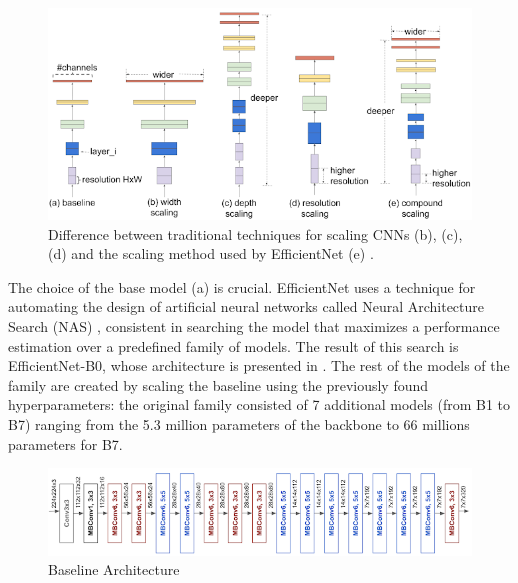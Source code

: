  \begin{figure}[tb]
    \centering
    \includegraphics[width=\textwidth]{figures/chapter5/efficient/compoundScaling.png}
    \caption{Difference between traditional techniques for scaling CNNs (b), (c), (d) and the scaling method used by EfficientNet (e) \cite{efficientNet}.}
    \label{fig:scaling}
\end{figure}
The choice of the base model (a) is crucial. EfficientNet uses a technique for automating the design of artificial neural networks called Neural Architecture Search (NAS) \cite{white2023neural}, consistent in searching the model that maximizes a performance estimation over a predefined family of models. The result of this search is EfficientNet-B0, whose architecture is presented in . The rest of the models of the family are created by scaling the baseline using the previously found hyperparameters: the original family consisted of 7 additional models (from B1 to B7) ranging from the 5.3 million parameters of the backbone to 66 millions parameters for B7.

\begin{figure}[tb]
    \centering
    \includegraphics[width=\textwidth]{figures/chapter5/efficient/EfficientNetv0.png}
    \caption{Baseline Architecture}
    \label{fig:baseline}
\end{figure}

